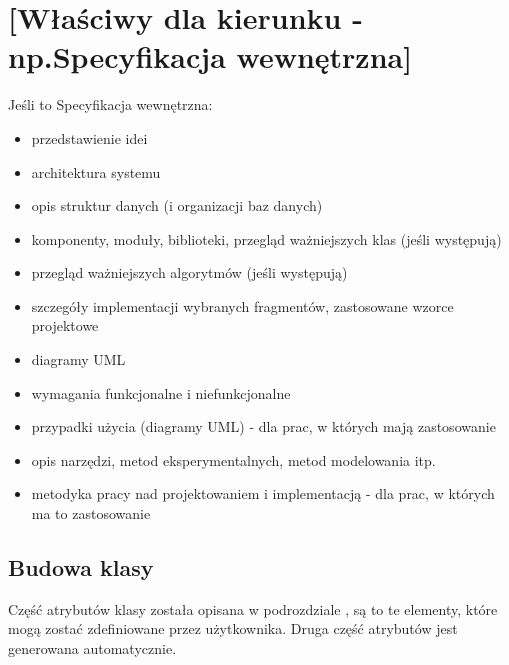\chapter{[Właściwy dla kierunku - np.Specyfikacja wewnętrzna]}
Jeśli to Specyfikacja wewnętrzna:
\begin{itemize}
\item przedstawienie idei
\item architektura systemu
\item opis struktur danych (i organizacji baz danych)
\item komponenty, moduły, biblioteki, przegląd ważniejszych klas (jeśli występują)
\item przegląd ważniejszych algorytmów (jeśli występują)
\item szczegóły implementacji wybranych fragmentów, zastosowane wzorce projektowe
\item diagramy UML
\end{itemize}


\begin{itemize}
\item wymagania funkcjonalne i niefunkcjonalne
\item przypadki użycia (diagramy UML) - dla prac, w których mają zastosowanie
\item opis narzędzi, metod eksperymentalnych, metod modelowania itp.
\item metodyka pracy nad projektowaniem i implementacją - dla prac, w których ma to zastosowanie
\end{itemize}

\section{Budowa klasy}

\quad Część atrybutów klasy została opisana w podrozdziale \textbf{}, są to te elementy, które mogą zostać zdefiniowane przez użytkownika. Druga część atrybutów jest generowana automatycznie. 

